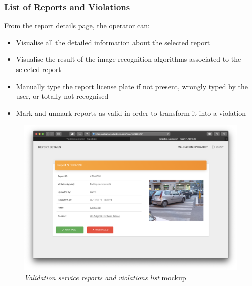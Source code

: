		\clearpage
\subsubsection{List of Reports and Violations}

From the report details page, the operator can:
\begin{itemize}
	\item Visualise all the detailed information about the selected report
	\item Visualise the result of the image recognition algorithms associated to the selected report
	\item Manually type the report license plate if not present, wrongly typed by the user, or totally not recognised
	\item Mark and unmark reports as valid in order to transform it into a violation\newline\newline
\end{itemize}

\begin{figure}[ht!]
	\hspace*{-1cm}
	\centering
	\includegraphics[scale=0.3]{mockups/validationApp2.png}
	\caption{
		\label{fig:cc2} 
		\emph{Validation service reports and violations list} mockup
	}
\end{figure}